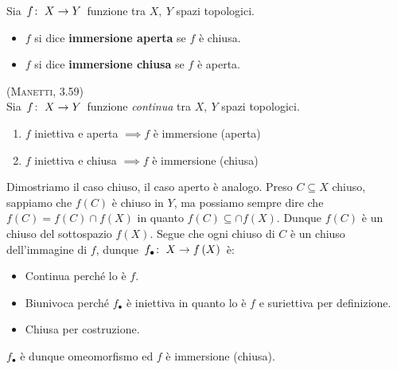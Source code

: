 \begin{define}
Sia $\funz{f}{X}{Y}$ funzione tra $X,\ Y$ spazi topologici.
\begin{itemize}
\item $f$ si dice \textbf{immersione aperta} se $f$ è chiusa.
\item $f$ si dice \textbf{immersione chiusa} se $f$ è aperta.
\end{itemize}
\end{define}
\begin{lemming}\textsc{(Manetti, 3.59)}\\
Sia $\funz{f}{X}{Y}$ funzione \textit{continua} tra $X,\ Y$ spazi topologici.
\begin{enumerate}
\item $f$ iniettiva e aperta $\implies f$ è immersione (aperta)
\item $f$ iniettiva e chiusa $\implies f$ è immersione (chiusa)
\end{enumerate}
\end{lemming}
\begin{demonstration}
Dimostriamo il caso chiuso, il caso aperto è analogo.
Preso $C\subseteq X$ chiuso, sappiamo che $f\left(C\right)$ è chiuso in $Y$, ma possiamo sempre dire che $f\left(C\right)=f\left(C\right)\cap f\left(X\right)$ in quanto $f\left(C\right)\subseteq \cap f\left(X\right)$. Dunque $f\left(C\right)$ è un chiuso del sottospazio $f\left(X\right)$. Segue che ogni chiuso di $C$ è un chiuso dell'immagine di $f$, dunque $\funz{f_{\bullet}}{X}{f\left(X\right)}$ è:
\begin{itemize}
\item Continua perché lo è $f$.
\item Biunivoca perché $f_{\bullet}$ è iniettiva in quanto lo è $f$ e suriettiva per definizione.
\item Chiusa per costruzione.
\end{itemize}
$f_{\bullet}$ è dunque omeomorfismo ed $f$ è immersione (chiusa).
\end{demonstration}
